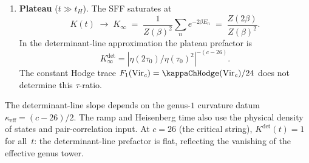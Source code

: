\begin{theorem}
\begin{enumerate}[label=\textup{(\roman*)}]
\begin{equation}
 \qquad
 t_H = 2\pi \cdot e^{S_0}
 \end{equation}
 is the Heisenberg time. In the bar-complex language: the
 linear ramp is the \emph{connected} genus-$1$ two-point function
 of $\Theta^{(1)}$, i.e., the pair correlation of the
 eigenvalue density. The annular bar complex
 $B^{\mathrm{ann}}(\mathrm{Vir}_c)$ contributes
 through the wrap-around differential $d_{\mathrm{wrap}}$
 (Theorem~\ref{thm:annular-bar-differential}(d)):
 the connected spectral two-point function is the
 coHochschild trace of $C_\Delta \square_{C^e}^{\mathbf{L}}
 C_\Delta$, restricted to the eigenvalue-pair stratum.
 The linear growth \(K \sim t/t_H\) is the universal
 GUE prediction; matching it to the annular bar complex requires the
 physical spectral-statistics hypothesis above.
\item \textbf{Plateau} ($t \gg t_H$). The SFF saturates at
 \begin{equation}\label{eq:sff-plateau}
 K(t) \;\to\; K_\infty
 \;=\; \frac{1}{Z(\beta)^2}\sum_n e^{-2\beta E_n}
 \;=\; \frac{Z(2\beta)}{Z(\beta)^2}.
 \end{equation}
 In the determinant-line approximation the plateau prefactor is
 \[
 K_\infty^{\mathrm{det}}
 =|\eta(2\tau_0)/\eta(\tau_0)^2|^{-(c-26)} .
 \]
 The constant Hodge trace
 \(F_1(\mathrm{Vir}_c)=\kappaChHodge(\mathrm{Vir}_c)/24\)
 does not determine this
 \(\tau\)-ratio.
\end{enumerate}
The determinant-line slope depends on the genus-$1$ curvature datum
\(\kappa_{\mathrm{eff}}=(c-26)/2\). The ramp and Heisenberg time also
use the physical density of states and pair-correlation input.
At $c = 26$ (the critical string), $K^{\mathrm{det}}(t) = 1$ for all~$t$:
the determinant-line prefactor is flat, reflecting the vanishing of
the effective genus tower.
\end{theorem}

